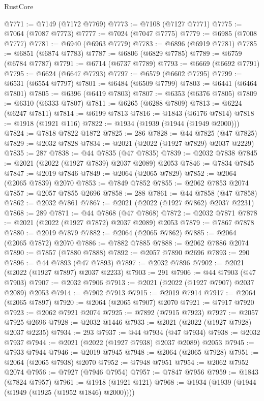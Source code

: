 \begin{lexlean}{RustCore}
\begin{coremodule}
@7771 := @7149 (@7172 @7769)
@7773 := @7108 (@7127 @7771)
@7775 := @7064 (@7087 @7773)
@7777 := @7024 (@7047 @7775)
@7779 := @6985 (@7008 @7777)
@7781 := @6940 (@6963 @7779)
@7783 := @6896 (@6919 @7781)
@7785 := @6851 (@6874 @7783)
@7787 := @6806 (@6829 @7785)
@7789 := @6759 (@6784 @7787)
@7791 := @6714 (@6737 @7789)
@7793 := @6669 (@6692 @7791)
@7795 := @6624 (@6647 @7793)
@7797 := @6579 (@6602 @7795)
@7799 := @6531 (@6554 @7797)
@7801 := @6484 (@6509 @7799)
@7803 := @6441 (@6464 @7801)
@7805 := @6396 (@6419 @7803)
@7807 := @6353 (@6376 @7805)
@7809 := @6310 (@6333 @7807)
@7811 := @6265 (@6288 @7809)
@7813 := @6224 (@6247 @7811)
@7814 := @6199 @7813
@7816 := @1843 (@6176 @7814)
@7818 := @1918 (@1921 @116)
@7822 := @1934 (@1939 (@1944 (@1949 @2000)))
@7824 := @7818 @7822 @1872
@7825 := 286
@7828 := @44 @7825 (@47 @7825)
@7829 := @2032 @7828
@7834 := @2021 (@2022 (@1927 @7829) @2037 @2229)
@7835 := 287
@7838 := @44 @7835 (@47 @7835)
@7839 := @2032 @7838
@7845 := @2021 (@2022 (@1927 @7839) @2037 @2089) @2053
@7846 := @7834 @7845
@7847 := @2019 @7846
@7849 := @2064 (@2065 @7829)
@7852 := @2064 (@2065 @7839) @2070
@7853 := @7849 @7852
@7855 := @2062 @7853 @2074
@7857 := @2057 @7855 @2696
@7858 := 288
@7861 := @44 @7858 (@47 @7858)
@7862 := @2032 @7861
@7867 := @2021 (@2022 (@1927 @7862) @2037 @2231)
@7868 := 289
@7871 := @44 @7868 (@47 @7868)
@7872 := @2032 @7871
@7878 := @2021 (@2022 (@1927 @7872) @2037 @2089) @2053
@7879 := @7867 @7878
@7880 := @2019 @7879
@7882 := @2064 (@2065 @7862)
@7885 := @2064 (@2065 @7872) @2070
@7886 := @7882 @7885
@7888 := @2062 @7886 @2074
@7890 := @7857 (@7880 @7888)
@7892 := @2057 @7890 @2696
@7893 := 290
@7896 := @44 @7893 (@47 @7893)
@7897 := @2032 @7896
@7902 := @2021 (@2022 (@1927 @7897) @2037 @2233)
@7903 := 291
@7906 := @44 @7903 (@47 @7903)
@7907 := @2032 @7906
@7913 := @2021 (@2022 (@1927 @7907) @2037 @2089) @2053
@7914 := @7902 @7913
@7915 := @2019 @7914
@7917 := @2064 (@2065 @7897)
@7920 := @2064 (@2065 @7907) @2070
@7921 := @7917 @7920
@7923 := @2062 @7921 @2074
@7925 := @7892 (@7915 @7923)
@7927 := @2057 @7925 @2696
@7928 := @2032 @1446
@7933 := @2021 (@2022 (@1927 @7928) @2037 @2235)
@7934 := 293
@7937 := @44 @7934 (@47 @7934)
@7938 := @2032 @7937
@7944 := @2021 (@2022 (@1927 @7938) @2037 @2089) @2053
@7945 := @7933 @7944
@7946 := @2019 @7945
@7948 := @2064 (@2065 @7928)
@7951 := @2064 (@2065 @7938) @2070
@7952 := @7948 @7951
@7954 := @2062 @7952 @2074
@7956 := @7927 (@7946 @7954)
@7957 := @7847 @7956
@7959 := @1843 (@7824 @7957)
@7961 := @1918 (@1921 @121)
@7968 := @1934 (@1939 (@1944 (@1949 (@1925 (@1952 @1846) @2000))))

\end{coremodule}
\end{lexlean}
